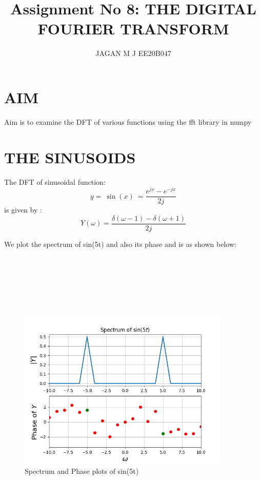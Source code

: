 \documentclass[10pt,a4paper]{article}
\date{}
\begin{document}
\title{Assignment No 8: THE DIGITAL FOURIER TRANSFORM}
\author{JAGAN M J EE20B047}
\maketitle


\section{AIM}

Aim is to examine the DFT of various functions using the fft library in numpy

\section{THE SINUSOIDS}
The DFT of sinusoidal function: \\

\begin{equation*}
 y = \ \sin(x) \ = \frac{e^{jx} - e^{-jx}}{2j} 
\end{equation*}
is given by :\\
\begin{equation*}
Y(\omega) = \frac{\delta (\omega - 1) - \delta (\omega + 1)}{2j}
\end{equation*}

We plot the spectrum of sin(5t) and also its phase and is as shown below: \\\\\\\\\\\\\\

\begin{figure}[!tbh]

\includegraphics[width = 0.9\textwidth]{1- spectrum of sin(5t) [with NO errors in plot].png}
\caption{Spectrum and Phase plots of sin(5t)}

\end{figure}
\end{document}
